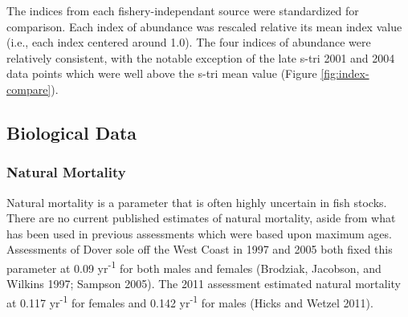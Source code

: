\documentclass[11pt,
  english,
  a4paper,
]{article}
\begin{document}
\leavevmode\tagmcend\tagstructend


The indices from each fishery-independant source were standardized for comparison. Each index of abundance was rescaled relative its mean index value (i.e., each index centered around 1.0). The four indices of abundance were relatively consistent, with the notable exception of the late \gls{s-tri} 2001 and 2004 data points which were well above the \gls{s-tri} mean value (Figure \ref{fig:index-compare}).

\leavevmode\tagmcend\tagstructend\par


\hypertarget{biological-data}{%
\subsection{Biological Data}\label{biological-data}}

\leavevmode\tagmcend\tagstructend


\hypertarget{natural-mortality}{%
\subsubsection{Natural Mortality}\label{natural-mortality}}

\leavevmode\tagmcend\tagstructend


Natural mortality is a parameter that is often highly uncertain in fish stocks. There are no current published estimates of natural mortality, aside from what has been used in previous assessments which were based upon maximum ages. Assessments of Dover sole off the West Coast in 1997 and 2005 both fixed this parameter at 0.09 yr\textsuperscript{-1} for both males and females {(Brodziak, Jacobson, and Wilkins 1997; Sampson 2005)\leavevmode\tagmcend\tagstructend}. The 2011 assessment estimated natural mortality at 0.117 yr\textsuperscript{-1} for females and 0.142 yr\textsuperscript{-1} for males {(Hicks and Wetzel 2011)\leavevmode\tagmcend\tagstructend}.

\leavevmode\tagmcend\tagstructend\par
\end{document}

